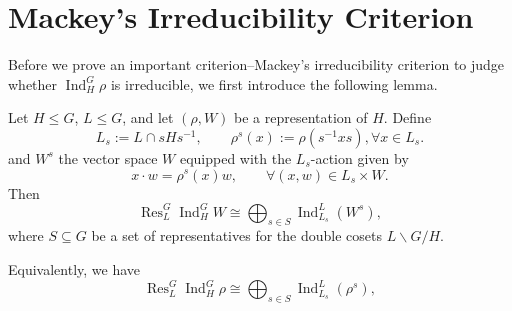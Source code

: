 \chapter{Mackey's Irreducibility Criterion}


Before we prove an important criterion--Mackey's irreducibility criterion to judge whether \(\operatorname{Ind}_H^G \rho\) is irreducible, we first introduce the following lemma. 
\begin{lemma}\label{lem:Mackey's Irreducibility Criterion}
Let \(H \le G\), \(L \le G\), and let \((\rho, W)\) be a representation of \(H\). Define
\[
L_s := L \cap s H s^{-1}, \qquad
\rho^s(x) := \rho(s^{-1} x s) , \forall x \in L_s.
\]and  \(W^s\) the vector space \(W\) equipped with the \(L_s\)-action given by
\[
x \cdot w = \rho^s(x) w , \qquad \forall(x,w) \in L_s\times W.
\]
Then
\[
\operatorname{Res}_L^G \operatorname{Ind}_H^G W
\cong
\bigoplus_{s \in S}
\operatorname{Ind}_{L_s}^L (W^s),
\]
where \(S \subseteq G\) be a set of representatives for the  double cosets \(L\backslash G/H\).

Equivalently, we have\[
\operatorname{Res}_L^G \operatorname{Ind}_H^G \rho
\cong
\bigoplus_{s \in S}
\operatorname{Ind}_{L_s}^L (\rho^s),
\]
\end{lemma}

